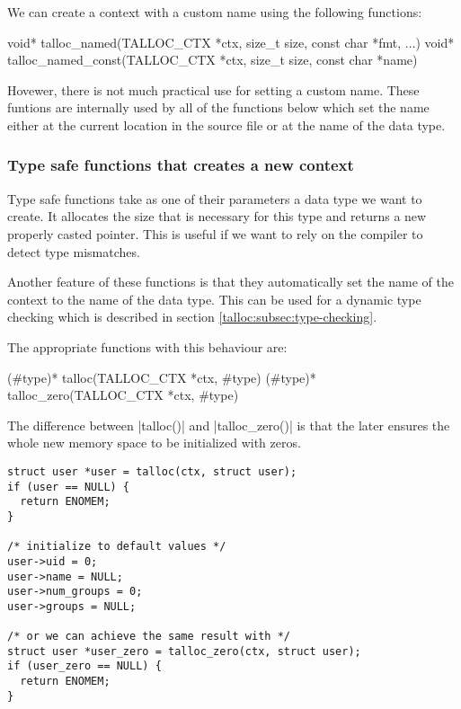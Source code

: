 We can create a context with a custom name using the following functions: 

\begin{funcproto}
void* talloc_named(TALLOC_CTX *ctx, size_t size,
                   const char *fmt, ...)
void* talloc_named_const(TALLOC_CTX *ctx, size_t size,
                         const char *name)
\end{funcproto}
\funclistend
Hovewer, there is not much practical use for setting a custom name. These
funtions are internally used by all of the functions below which set the name
either at the current location in the source file or at the name of the data
type.

\subsubsection{Type safe functions that creates a new context}

Type safe functions take as one of their parameters a data type we want to
create. It allocates the size that is necessary for this type and returns a new
properly casted pointer. This is useful if we want to rely on the compiler to
detect type mismatches.

Another feature of these functions is that they automatically set the name of
the context to the name of the data type. This can be used for a dynamic type
checking which is described in section \ref{talloc:subsec:type-checking}.

The appropriate functions with this behaviour are:

\begin{funcproto}
(#type)* talloc(TALLOC_CTX *ctx, #type)
(#type)* talloc_zero(TALLOC_CTX *ctx, #type)
\end{funcproto}
\funclistend
The difference between |talloc()| and |talloc_zero()| is that the later ensures
the whole new memory space to be initialized with zeros.

\begin{lstlisting}[caption={talloc() and talloc_zero()},label=lst:talloc_zero]
struct user *user = talloc(ctx, struct user);
if (user == NULL) {
  return ENOMEM;
}

/* initialize to default values */
user->uid = 0;
user->name = NULL;
user->num_groups = 0;
user->groups = NULL;

/* or we can achieve the same result with */
struct user *user_zero = talloc_zero(ctx, struct user);
if (user_zero == NULL) {
  return ENOMEM;
}
\end{lstlisting}

